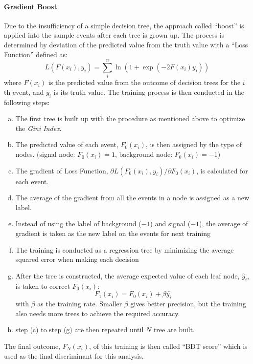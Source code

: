 \\{\bf Gradient Boost}
\\
\\Due to the insufficiency of a simple decision tree, the approach called ``boost'' is applied into the sample events after each tree is grown up. The process is determined by deviation of the predicted value from the truth value with a ``Loss Function'' defined as:
\begin{equation}
L(F(x_{i}), y_{i}) = \sum_{i}^{n}\ln(1+\exp{(-2F(x_i)y_{i})})
\end{equation} 
where $F(x_{i})$ is the predicted value from the outcome of decision trees for the $i$th event, and $y_{i}$ is its truth value. The training process is then conducted in the following steps:
\begin{enumerate}[(a)]
	\item  The first tree is built up with the procedure as mentioned above to optimize the \textit{Gini Index}.
	\item  The predicted value of each event, $F_{0}(x_i)$, is then assigned by the type of nodes. (signal node: $F_{0}(x_i)=1$, background node: $F_{0}(x_i)=-1$)
	\item  The gradient of Loss Function, $\partial L(F_{0}(x_{i}), y_{i}) / \partial F_{0}(x_i)$, is calculated for each event.
	\item  The average of the gradient from all the events in a node is assigned as a new label.
	\item  Instead of using the label of background ($-1$) and signal ($+1$), the average of gradient is taken as the new label on the events for next training
	\item  The training is conducted as a regression tree by minimizing the average squared error when making each decision
	\item  After the tree is constructed, the average expected value of each leaf node, $\hat{y}_{i}$, is taken to correct $F_{0}(x_i)$:
	\begin{equation}
	F_{1}(x_i) = F_{0}(x_i)+\beta \hat{y_i}
	\end{equation}
	with $\beta$ as the training rate. Smaller $\beta$ gives better precision, but the training also needs more trees to achieve the required accuracy. 
	\item step (c) to step (g)  are then repeated until $N$ tree are built.
\end{enumerate}
The final outcome, $F_N(x_{i})$, of this training is then called ``BDT score'' which is used as the final discriminant for this analysis. 

